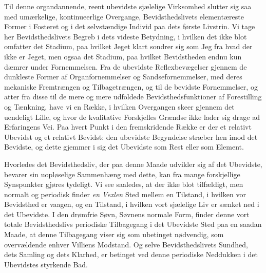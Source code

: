 \documentclass[12pt,a4paper,openany]{book}
\begin{document}
Til denne organdannende, reent ubevidste sjælelige Virksomhed
slutter sig saa med umærkelige, kontinueerlige Overgange,
Bevidsthedslivets elementæreste Former i Fosteret og
i det selvstændige Individ paa dets første Livstrin. Vi tage
her Bevidsthedslivets Begreb i dets videste Betydning, i
hvilken det ikke blot omfatter det Stadium, paa hvilket Jeget
klart sondrer sig som Jeg fra hvad der ikke er Jeget, men
ogsaa det Stadium, paa hvilket Bevidstheden endnu kun
dæmrer under Fornemmelsen. Fra de ubevidste Reflexbevægelser
gjennem de dunkleste Former af Organfornemmelser og Sandsefornemmelser,
med deres mekaniske Fremtrængen og Tilbagetrængen,
og til de bevidste Fornemmelser, og atter fra disse
til de mere og mere udfoldede Bevidsthedsfunktioner af Forestilling
og Tænkning, have vi en Række, i hvilken Overgangen
skeer gjennem det uendeligt Lille, og hvor de kvalitative
Forskjelles Grændse ikke lader sig drage ad Erfaringens Vei.
Paa hvert Punkt i den fremskridende Række er der et relativt
Ubevidst og et relativt Bevidst: den ubevidste Begyndelse
stræber hen imod det Bevidste, og dette gjemmer i sig det
Ubevidste som Rest eller som Element.

Hvorledes det Bevidsthedsliv, der paa denne Maade
udvikler sig af det Ubevidste, bevarer sin uopløselige Sammenhæng
med dette, kan fra mange forskjellige Synspunkter
gjøres tydeligt. Vi see saaledes, at der ikke blot tilfældigt,
men normalt og periodisk finder \emph{en Vexlen} Sted mellem
en Tilstand, i hvilken vor Bevidsthed er vaagen, og en Tilstand,
i hvilken vort sjælelige Liv er sænket ned i det Ubevidste.
I den drømfrie Søvn, Søvnens normale Form, finder denne
vort totale Bevidsthedslivs periodiske Tilbagegang i det Ubevidste
Sted paa en saadan Maade, at denne Tilbagegang viser sig
som ubetinget nødvendig, som overvældende enhver Villiens
Modstand. Og selve Bevidsthedslivets Sundhed, dets Samling
og dets Klarhed, er betinget ved denne periodiske Neddukken
i det Ubevidstes styrkende Bad.
\end{document}
